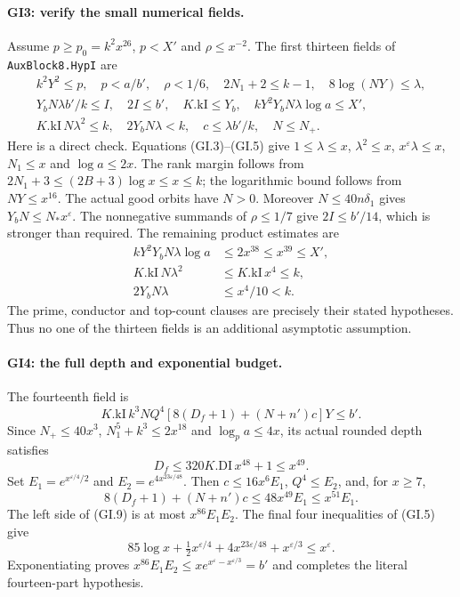 \paragraph{GI3: verify the small numerical fields.}
Assume $p\ge p_0=k^2x^{26}$, $p<X'$ and $\rho\le x^{-2}$.
The first thirteen fields of \texttt{AuxBlock8.HypI} are
\[
\begin{gathered}
 k^2Y^2\le p,\quad p<a/b',\quad \rho<1/6,
 \quad 2N_1+2\le k-1,\quad 8\log(NY)\le\lambda,\\
 Y_bN\lambda b'/k\le I,\quad 2I\le b',\quad
 K.\mathrm{kI}\le Y_b,\quad
 kY^2Y_bN\lambda\log a\le X',\\
 K.\mathrm{kI}\,N\lambda^2\le k,\quad
 2Y_bN\lambda<k,\quad c\le\lambda b'/k,\quad N\le N_+.
\end{gathered}                                                    \tag{GI.7}
\]
Here is a direct check. Equations (GI.3)--(GI.5) give
$1\le\lambda\le x$, $\lambda^2\le x$,
$x^\varepsilon\lambda\le x$, $N_1\le x$ and
$\log a\le2x$. The rank margin follows from
$2N_1+3\le(2B+3)\log x\le x\le k$; the logarithmic bound
follows from $NY\le x^{16}$. The actual good orbits have $N>0$.
Moreover $N\le40n\delta_1$ gives $Y_bN\le N_*x^\varepsilon$.
The nonnegative summands of $\rho\le1/7$ give
$2I\le b'/14$, which is stronger than required.
The remaining product estimates are
\[
\begin{aligned}
 kY^2Y_bN\lambda\log a&\le2x^{38}\le x^{39}\le X',\\
 K.\mathrm{kI}\,N\lambda^2&\le K.\mathrm{kI}\,x^4\le k,\\
 2Y_bN\lambda&\le x^4/10<k.
\end{aligned}                                                    \tag{GI.8}
\]
The prime, conductor and top-count clauses are precisely their
stated hypotheses. Thus no one of the thirteen fields is an
additional asymptotic assumption.

\paragraph{GI4: the full depth and exponential budget.}
The fourteenth field is
\[
 K.\mathrm{kI}\,k^3NQ^4[8(D_f+1)+(N+n')c]Y\le b'.       \tag{GI.9}
\]
Since $N_+\le40x^3$, $N_1^5+k^3\le2x^{18}$ and
$\log_p a\le4x$, its actual rounded depth satisfies
\[
 D_f\le320K.\mathrm{DI}\,x^{48}+1\le x^{49}.
\]
Set $E_1=e^{x^{\varepsilon/4}/2}$ and
$E_2=e^{4x^{23\varepsilon/48}}$. Then $c\le16x^6E_1$,
$Q^4\le E_2$, and, for $x\ge7$,
\[
 8(D_f+1)+(N+n')c\le48x^{49}E_1\le x^{51}E_1.
\]
The left side of (GI.9) is at most $x^{86}E_1E_2$.
The final four inequalities of (GI.5) give
\[
 85\log x+\tfrac12x^{\varepsilon/4}
       +4x^{23\varepsilon/48}+x^{\varepsilon/3}
       \le x^\varepsilon.
\]
Exponentiating proves $x^{86}E_1E_2\le
xe^{x^\varepsilon-x^{\varepsilon/3}}=b'$ and completes
the literal fourteen-part hypothesis.

